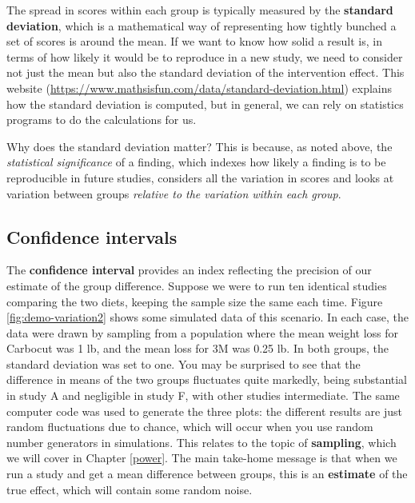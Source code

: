 \documentclass{krantz}
\begin{document}
The spread in scores within each group is typically measured by the \textbf{standard deviation}, which is a mathematical way of representing how tightly bunched a set of scores is around the mean. If we want to know how solid a result is, in terms of how likely it would be to reproduce in a new study, we need to consider not just the mean but also the standard deviation of the intervention effect. This website (\url{https://www.mathsisfun.com/data/standard-deviation.html}) explains how the standard deviation is computed, but in general, we can rely on statistics programs to do the calculations for us.

Why does the standard deviation matter? This is because, as noted above, the \emph{statistical significance} of a finding, which indexes how likely a finding is to be reproducible in future studies, considers all the variation in scores and looks at variation between groups \emph{relative to the variation within each group}.

\hypertarget{confidence-intervals}{%
\subsection{Confidence intervals}\label{confidence-intervals}}

The \textbf{confidence interval}  provides an index reflecting the precision of our estimate of the group difference. Suppose we were to run ten identical studies comparing the two diets, keeping the sample size the same each time. Figure \ref{fig:demo-variation2} shows some simulated data of this scenario. In each case, the data were drawn by sampling from a population where the mean weight loss for Carbocut was 1 lb, and the mean loss for 3M was 0.25 lb. In both groups, the standard deviation was set to one. You may be surprised to see that the difference in means of the two groups fluctuates quite markedly, being substantial in study A and negligible in study F, with other studies intermediate. The same computer code was used to generate the three plots: the different results are just random fluctuations due to chance, which will occur when you use random number generators in simulations. This relates to the topic of \textbf{sampling}, which we will cover in Chapter \ref{power}. The main take-home message is that when we run a study and get a mean difference between groups, this is an \textbf{estimate} of the true effect, which will contain some random noise.
\end{document}
